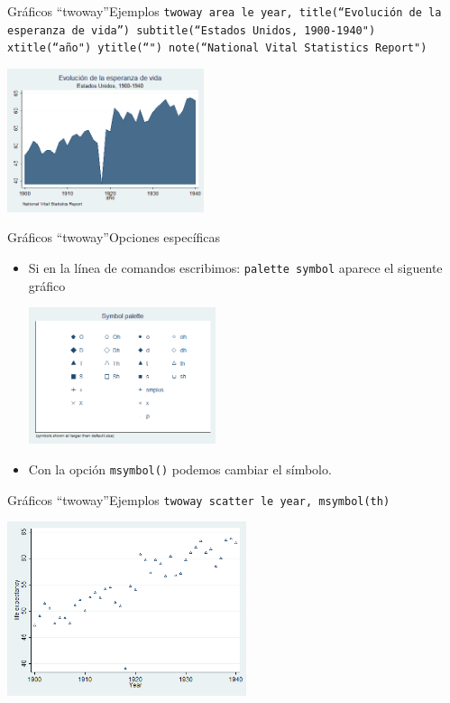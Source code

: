 \documentclass{beamer}
\begin{document}
\begin{frame}{Gráficos ``twoway''}{Ejemplos}
{\footnotesize \texttt{twoway area le year, title(``Evolución de la esperanza de vida'') subtitle(``Estados Unidos, 1900-1940") xtitle(``año") ytitle(``") note(``National Vital Statistics Report")}}\\\medskip
\centerline{\includegraphics[height=4.2cm]{twarea.png}}
\end{frame}


\begin{frame}{Gráficos ``twoway''}{Opciones específicas}
\begin{itemize}
\item Si en la línea de comandos escribimos: \texttt{palette symbol} aparece el siguente gráfico\\\medskip
\centerline{\includegraphics[height=4cm]{twop.png}}
\item Con la opción \texttt{msymbol()} podemos cambiar el símbolo.
\end{itemize}
\end{frame}

\begin{frame}{Gráficos ``twoway''}{Ejemplos}
{\footnotesize 
\texttt{twoway scatter le year, msymbol(th)}}\\\medskip
\centerline{\includegraphics[height=5.1cm]{twscatter1.png}}
\end{frame}
\end{document}
